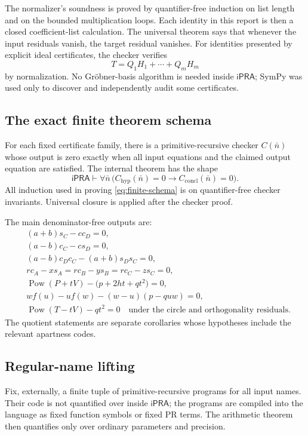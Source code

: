 \documentclass[11pt,letterpaper]{article}
\theoremstyle{definition}
\theoremstyle{remark}
\newcommand{\ipra}{\mathsf{iPRA}}
\newcommand{\PR}{\mathrm{PR}}
\newcommand{\Pow}{\operatorname{Pow}}
\begin{document}
The normalizer's soundness is proved by quantifier-free induction on list
length and on the bounded multiplication loops.  Each identity in this report
is then a closed coefficient-list calculation.  The universal theorem says
that whenever the input residuals vanish, the target residual vanishes.  For
identities presented by explicit ideal certificates, the checker verifies
\[
 T=Q_1H_1+\cdots+Q_mH_m
\]
by normalization.  No Gr\"obner-basis algorithm is needed inside \(\ipra\);
SymPy was used only to discover and independently audit some certificates.

\subsection{The exact finite theorem schema}

For each fixed certificate family, there is a primitive-recursive checker
\(C(\bar n)\) whose output is zero exactly when all input equations and the
claimed output equation are satisfied.  The internal theorem has the shape
\[
 \ipra\vdash\forall\bar n\,\bigl(C_{\mathrm{hyp}}(\bar n)=0
 \to C_{\mathrm{concl}}(\bar n)=0\bigr).
 \tag{9.1}\label{eq:finite-schema}
\]
All induction used in proving \eqref{eq:finite-schema} is on quantifier-free
checker invariants.  Universal closure is applied after the checker proof.

The main denominator-free outputs are:
\begin{align*}
 &(a+b)s_C-cc_D=0,\\
 &(a-b)c_C-cs_D=0,\\
 &(a-b)c_Dc_C-(a+b)s_Ds_C=0,\\
 &rc_A-xs_A=rc_B-ys_B=rc_C-zs_C=0,\\
 &\Pow(P+tV)-\bigl(p+2ht+qt^2\bigr)=0,\\
 &w f(u)-u f(w)-(w-u)(p-quw)=0,\\
 &\Pow(T-tV)-qt^2=0
 \quad\text{under the circle and orthogonality residuals.}
\end{align*}
The quotient statements are separate corollaries whose hypotheses include the
relevant apartness codes.

\subsection{Regular-name lifting}

Fix, externally, a finite tuple of primitive-recursive programs for all input
names.  Their code is not quantified over inside \(\ipra\); the programs are
compiled into the language as fixed function symbols or fixed \(\PR\) terms.
The arithmetic theorem then quantifies only over ordinary parameters and
precision.
\end{document}
